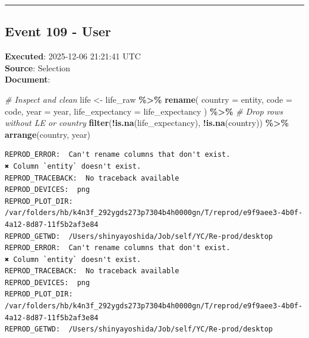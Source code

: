 \documentclass[
  11pt,
]{article}
\newenvironment{Shaded}{\begin{snugshade}}{\end{snugshade}}
\newcommand{\AttributeTok}[1]{\textcolor[rgb]{0.13,0.29,0.53}{#1}}
\newcommand{\CommentTok}[1]{\textcolor[rgb]{0.56,0.35,0.01}{\textit{#1}}}
\newcommand{\FunctionTok}[1]{\textcolor[rgb]{0.13,0.29,0.53}{\textbf{#1}}}
\newcommand{\NormalTok}[1]{#1}
\newcommand{\OtherTok}[1]{\textcolor[rgb]{0.56,0.35,0.01}{#1}}
\newcommand{\SpecialCharTok}[1]{\textcolor[rgb]{0.81,0.36,0.00}{\textbf{#1}}}
\newcommand{\StringTok}[1]{\textcolor[rgb]{0.31,0.60,0.02}{#1}}
\newenvironment{rpoutput}{\vspace{0.5em}\begin{snugshade}}{\end{snugshade}}
\begin{document}
\begin{center}\rule{0.5\linewidth}{0.5pt}\end{center}

\subsection{Event 109 - User}\label{event-109---user}

\textbf{Executed}: 2025-12-06 21:21:41 UTC\\
\textbf{Source}: Selection\\
\textbf{Document}:

\begin{Shaded}
\begin{Highlighting}[]
\CommentTok{\# Inspect and clean}
\NormalTok{life }\OtherTok{\textless{}{-}}\NormalTok{ life\_raw }\SpecialCharTok{\%\textgreater{}\%}
  \FunctionTok{rename}\NormalTok{(}
    \AttributeTok{country =}\NormalTok{ entity,}
    \AttributeTok{code =}\NormalTok{ code,}
    \AttributeTok{year =}\NormalTok{ year,}
    \AttributeTok{life\_expectancy =} \StringTok{\textasciigrave{}}\AttributeTok{life\_expectancy}\StringTok{\textasciigrave{}}
\NormalTok{  ) }\SpecialCharTok{\%\textgreater{}\%}
  \CommentTok{\# Drop rows without LE or country}
  \FunctionTok{filter}\NormalTok{(}\SpecialCharTok{!}\FunctionTok{is.na}\NormalTok{(life\_expectancy), }\SpecialCharTok{!}\FunctionTok{is.na}\NormalTok{(country)) }\SpecialCharTok{\%\textgreater{}\%}
  \FunctionTok{arrange}\NormalTok{(country, year)}
\end{Highlighting}
\end{Shaded}

\begin{rpoutput}

\begin{verbatim}
REPROD_ERROR:  Can't rename columns that don't exist.
✖ Column `entity` doesn't exist. 
REPROD_TRACEBACK:  No traceback available  
REPROD_DEVICES:  png 
REPROD_PLOT_DIR:  /var/folders/hb/k4n3f_292ygds273p7304b4h0000gn/T/reprod/e9f9aee3-4b0f-4a12-8d87-11f5b2af3e84 
REPROD_GETWD:  /Users/shinyayoshida/Job/self/YC/Re-prod/desktop 
REPROD_ERROR:  Can't rename columns that don't exist.
✖ Column `entity` doesn't exist. 
REPROD_TRACEBACK:  No traceback available  
REPROD_DEVICES:  png 
REPROD_PLOT_DIR:  /var/folders/hb/k4n3f_292ygds273p7304b4h0000gn/T/reprod/e9f9aee3-4b0f-4a12-8d87-11f5b2af3e84 
REPROD_GETWD:  /Users/shinyayoshida/Job/self/YC/Re-prod/desktop 
\end{verbatim}

\end{rpoutput}
\end{document}
